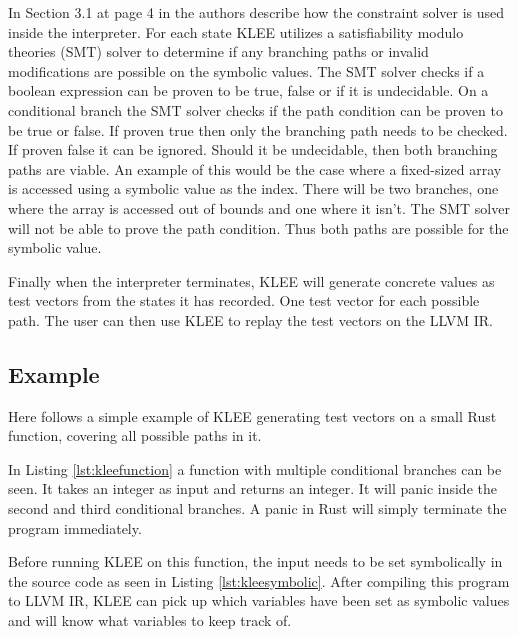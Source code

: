 In Section 3.1 at page 4 in \cite{kleepaper} the authors describe how the
constraint solver is used inside the interpreter. For each state KLEE utilizes
a satisfiability modulo theories (SMT) solver to determine if any branching
paths or invalid modifications are possible on the symbolic values. The SMT
solver checks if a boolean expression can be proven to be true, false or if it
is undecidable. On a conditional branch the SMT solver checks if the path
condition can be proven to be true or false. If proven true then only the
branching path needs to be checked. If proven false it can be ignored. Should
it be undecidable, then both branching paths are viable. An example of this
would be the case where a fixed-sized array is accessed using a symbolic value
as the index. There will be two branches, one where the array is accessed out
of bounds and one where it isn't. The SMT solver will not be able to prove the
path condition. Thus both paths are possible for the symbolic value.

Finally when the interpreter terminates, KLEE will generate concrete values as
test vectors from the states it has recorded. One test vector for each possible
path. The user can then use KLEE to replay the test vectors on the LLVM IR.

\subsection{Example}
Here follows a simple example of KLEE generating test vectors on a small Rust
function, covering all possible paths in it.

In Listing \ref{lst:kleefunction} a function with multiple conditional branches
can be seen. It takes an integer as input and returns an integer.  It will
panic inside the second and third conditional branches. A panic in Rust will
simply terminate the program immediately.


Before running KLEE on this function, the input needs to be set symbolically in
the source code as seen in Listing \ref{lst:kleesymbolic}. After compiling this
program to LLVM IR, KLEE can pick up which variables have been set as symbolic
values and will know what variables to keep track of.


